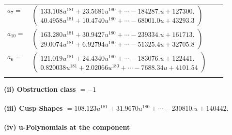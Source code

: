 \documentclass[1p]{elsarticle_modified}
\theoremstyle{definition}
\begin{document}
\begin{tabular}{m{7pt} m{180pt} m{7pt} m{180pt} }
\flushright $a_{7}=$&$\begin{pmatrix}133.108 u^{181}+23.5681 u^{180}+\cdots-184287. u+127300.\\40.4958 u^{181}+10.4740 u^{180}+\cdots-68001.0 u+43293.3\end{pmatrix}$ \\
\flushright $a_{10}=$&$\begin{pmatrix}163.280 u^{181}+30.9427 u^{180}+\cdots-239334. u+161713.\\29.0074 u^{181}+6.92794 u^{180}+\cdots-51325.4 u+32705.8\end{pmatrix}$ \\
\flushright $a_{6}=$&$\begin{pmatrix}121.019 u^{181}+24.4340 u^{180}+\cdots-183076. u+122441.\\0.820038 u^{181}+2.02066 u^{180}+\cdots-7688.34 u+4101.54\end{pmatrix}$\\&\end{tabular}
\flushleft \textbf{(ii) Obstruction class $= -1$}\\~\\
\flushleft \textbf{(iii) Cusp Shapes $= 108.123 u^{181}+31.9670 u^{180}+\cdots-230810. u+140442.$}\\~\\
\newpage\renewcommand{\arraystretch}{1}
\flushleft \textbf{(iv) u-Polynomials at the component}\newline \\
\end{document}
